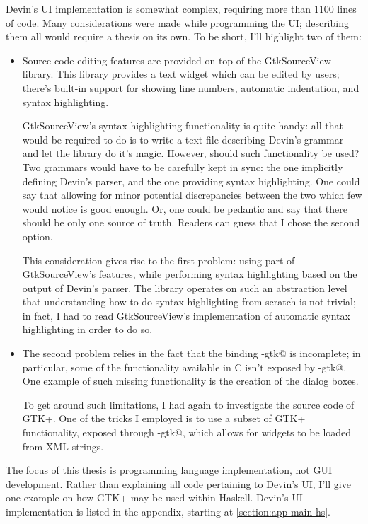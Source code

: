 \documentclass[UdineBachThesis,american,11pt]{PhdThesis}
\begin{document}
  Devin's UI implementation is somewhat complex, requiring more than 1100 lines
  of code. Many considerations were made while programming the UI; describing
  them all would require a thesis on its own. To be short, I'll highlight two
  of them:

  \begin{itemize}
    \item Source code editing features are provided on top of the GtkSourceView
    library. This library provides a text widget which can be edited by users;
    there's built-in support for showing line numbers, automatic indentation,
    and syntax highlighting.

    GtkSourceView's syntax highlighting functionality is quite handy: all that
    would be required to do is to write a text file describing Devin's grammar
    and let the library do it's magic. However, should such functionality be
    used? Two grammars would have to be carefully kept in sync: the one
    implicitly defining Devin's parser, and the one providing syntax
    highlighting. One could say that allowing for minor potential discrepancies
    between the two which few would notice is good enough. Or, one could be
    pedantic and say that there should be only one source of truth. Readers can
    guess that I chose the second option.

    This consideration gives rise to the first problem: using part of
    GtkSourceView's features, while performing syntax highlighting based on the
    output of Devin's parser. The library operates on such an abstraction level
    that understanding how to do syntax highlighting from scratch is not
    trivial; in fact, I had to read GtkSourceView's implementation of automatic
    syntax highlighting in order to do so.

    \item The second problem relies in the fact that the binding
    \lstinline@gi-gtk@ is incomplete; in particular, some of the functionality
    available in C isn't exposed by \lstinline@gi-gtk@. One example of such
    missing functionality is the creation of the dialog boxes.

    To get around such limitations, I had again to investigate the source code
    of GTK+. One of the tricks I employed is to use a subset of GTK+
    functionality, exposed through \lstinline@gi-gtk@, which allows for widgets
    to be loaded from XML strings.
  \end{itemize}

  The focus of this thesis is programming language implementation, not GUI
  development. Rather than explaining all code pertaining to Devin's UI, I'll
  give one example on how GTK+ may be used within Haskell. Devin's UI
  implementation is listed in the appendix, starting at
  \autoref{section:app-main-hs}.
\end{document}
